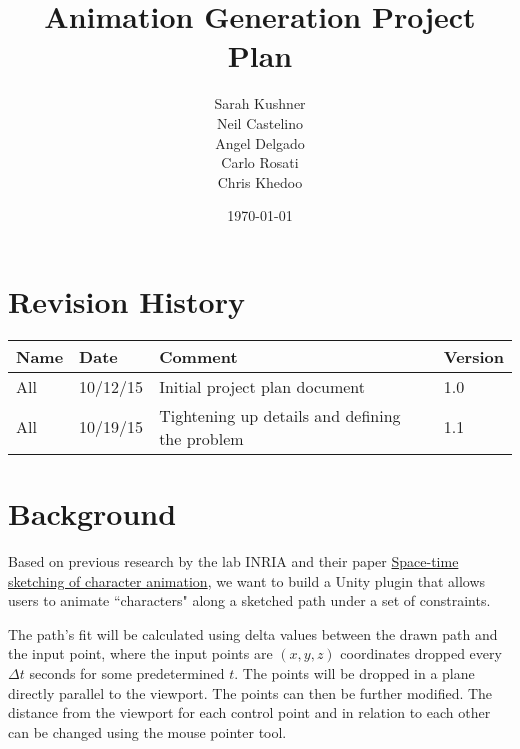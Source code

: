 \documentclass[12pt]{article}
\begin{document}
\title{Animation Generation Project Plan}
\author{Sarah Kushner \\
		Neil Castelino \\
		Angel Delgado \\
		Carlo Rosati \\
		Chris Khedoo}
\date{\today}
\maketitle

\pagebreak

\section{Revision History}
\begin{table}[hp]
\centering
\begin{tabular}{|l|l|l|l|}
\hline
Name 		& Date	 		& 	Comment	 								& 	Version	 \\ \hline
All		& 10/12/15		& 	Initial project plan document			&  	1.0 		 \\ \hline
All		& 10/19/15		& 	Tightening up details and defining the problem			&  	1.1 		 \\ \hline
\end{tabular}
\end{table}

\pagebreak

\section{Background}
\label{sec:back}
Based on previous research by the lab INRIA and their paper \href{https://hal.archives-ouvertes.fr/hal-01153763/file/SpaceTimeSketching.pdf}{Space-time sketching of character animation}, we want to build a Unity plugin that allows users to animate ``characters" along a sketched path under a set of constraints.

The path’s fit will be calculated using delta values between the drawn path and the input point, where the input points are $(x,y,z)$ coordinates dropped every $\Delta t$ seconds for some predetermined $t$. The points will be dropped in a plane directly parallel to the viewport. The points can then be further modified. The distance from the viewport for each control point and in relation to each other can be changed using the mouse pointer tool.
\end{document}
